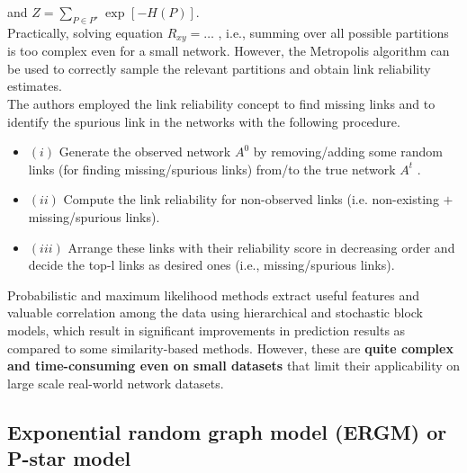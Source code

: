 and \(Z = \sum_{P \in P^{\star}} \text{ exp } \left[ -H(P) \right]\).\\

Practically, solving equation \(R_{xy} = \ldots\) , i.e., summing over
all possible partitions is too complex even for a small network.
However, the Metropolis algorithm can be used to correctly sample the
relevant partitions and obtain link reliability estimates.\\

The authors employed the link reliability concept to find missing links
and to identify the spurious link in the networks with the following
procedure.

\begin{itemize}
    \item
          \((i)\) Generate the observed network \(A^0\) by removing/adding some
          random links (for finding missing/spurious links) from/to the true
          network \(A^t\) .
    \item
          \((ii)\) Compute the link reliability for non-observed links (i.e.
          non-existing \(+\) missing/spurious links).
    \item
          \((iii)\) Arrange these links with their reliability score in
          decreasing order and decide the top-l links as desired ones (i.e.,
          missing/spurious links).
\end{itemize}

Probabilistic and maximum likelihood methods extract useful features and
valuable correlation among the data using hierarchical and stochastic
block models, which result in significant improvements in prediction
results as compared to some similarity-based methods. However, these are
\textbf{quite complex and time-consuming even on small datasets} that
limit their applicability on large scale real-world network datasets.

\subsection{Exponential random graph model (ERGM) or P-star model}
